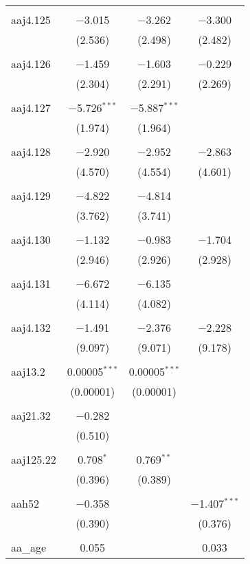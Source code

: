 \begin{table}[!htbp]
\begin{tabular}{@{\extracolsep{5pt}}lccc}
  & & & \\ 
 aaj4.125 & $-$3.015 & $-$3.262 & $-$3.300 \\ 
  & (2.536) & (2.498) & (2.482) \\ 
  & & & \\ 
 aaj4.126 & $-$1.459 & $-$1.603 & $-$0.229 \\ 
  & (2.304) & (2.291) & (2.269) \\ 
  & & & \\ 
 aaj4.127 & $-$5.726$^{***}$ & $-$5.887$^{***}$ &  \\ 
  & (1.974) & (1.964) &  \\ 
  & & & \\ 
 aaj4.128 & $-$2.920 & $-$2.952 & $-$2.863 \\ 
  & (4.570) & (4.554) & (4.601) \\ 
  & & & \\ 
 aaj4.129 & $-$4.822 & $-$4.814 &  \\ 
  & (3.762) & (3.741) &  \\ 
  & & & \\ 
 aaj4.130 & $-$1.132 & $-$0.983 & $-$1.704 \\ 
  & (2.946) & (2.926) & (2.928) \\ 
  & & & \\ 
 aaj4.131 & $-$6.672 & $-$6.135 &  \\ 
  & (4.114) & (4.082) &  \\ 
  & & & \\ 
 aaj4.132 & $-$1.491 & $-$2.376 & $-$2.228 \\ 
  & (9.097) & (9.071) & (9.178) \\ 
  & & & \\ 
 aaj13.2 & 0.00005$^{***}$ & 0.00005$^{***}$ &  \\ 
  & (0.00001) & (0.00001) &  \\ 
  & & & \\ 
 aaj21.32 & $-$0.282 &  &  \\ 
  & (0.510) &  &  \\ 
  & & & \\ 
 aaj125.22 & 0.708$^{*}$ & 0.769$^{**}$ &  \\ 
  & (0.396) & (0.389) &  \\ 
  & & & \\ 
 aah52 & $-$0.358 &  & $-$1.407$^{***}$ \\ 
  & (0.390) &  & (0.376) \\ 
  & & & \\ 
 aa\_age & 0.055 &  & 0.033 \\ 

\end{tabular}
\end{table}
